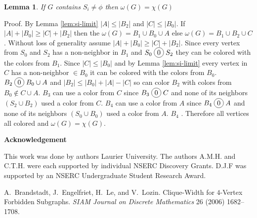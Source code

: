 \documentclass[12pt]{article}
\newcommand*\circled[1]{\tikz[baseline=(char.base)]{
            \node[shape=circle,draw,inner sep=2pt] (char) {#1};}}
\newtheorem{Lemma}[Theorem]{Lemma}
\begin{document}
\begin{Lemma}\label{lem:omega-equals-chromatic}
If $G$ contains $S_i \neq \phi$ then $\omega(G) = \chi(G)$
\end{Lemma}
\noindent {\it} Proof. By Lemma \ref{lem:si-limit} $|A| \leq |B_2$| and $|C| \leq |B_0|$. If $|A| + |B_0| \geq |C| + |B_2|$ then the $\omega(G) = B_1 \cup B_0 \cup A$ else $\omega(G) = B_1 \cup B_2 \cup C$. Without loss of generality assume $|A| +|B_0| \geq |C| + |B_2|$. Since every vertex from $S_0$ and $S_2$ has a non-neighbor in $B_1$ and $S_0 \;\circled{0}\; S_2$ they can be colored with the colors from $B_1$. Since $|C| \leq |B_0|$ and by Lemma \ref{lem:si-limit} every vertex in $C$ has a non-neighbor $\in B_0$ it can be colored with the colors from $B_0$. $B_2 \;\circled{0}\;B_0 \cup A$ and $|B_2| \leq |B_0| +|
A| - |C|$ so can color $B_2$ with colors from $B_0 \not \in C \cup A$. $B_3$ can use a color from $C$ since $B_3 \;\circled{0}\; C$ and none of its neighbors $(S_2 \cup B_2)$ used a color from $C$. $B_4$ can use a color from $A$ since $B_4 \;\circled{0}\; A$ and none of its neighbors $(S_0 \cup B_0)$ used a color from $A$. $B_4$ . Therefore all vertices all colored and $\omega(G) = \chi(G)$.

\begin{center}
{\bf Acknowledgement}
\end{center}
This work was done by authors  Laurier University. The authors A.M.H. and C.T.H. were each supported by individual NSERC Discovery Grants. D.J.F was supported by an NSERC Undergraduate Student Research Award.


\clearpage
\begin{thebibliography}{99}


    A.~Brandstadt, J.~Engelfriet, H.~Le, and V.~Lozin. Clique-Width for $4$-Vertex Forbidden Subgraphs.  {\sl SIAM
     Journal on Discrete Mathematics} 26 (2006) 1682--1708.

\end{thebibliography}
\end{document}
